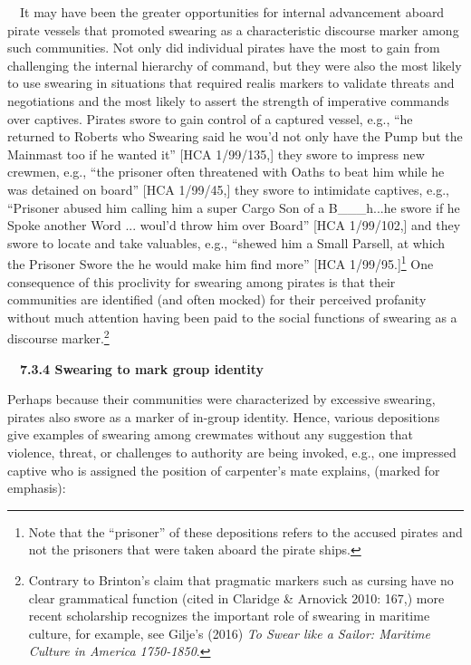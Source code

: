 \begin{styleStandard}
\ \ It may have been the greater opportunities for internal advancement aboard pirate vessels that promoted swearing as a characteristic discourse marker among such communities. Not only did individual pirates have the most to gain from challenging the internal hierarchy of command, but they were also the most likely to use swearing in situations that required realis markers to validate threats and negotiations and the most likely to assert the strength of imperative commands over captives. Pirates swore to gain control of a captured vessel, e.g., “he returned to Roberts who Swearing said he wou’d not only have the Pump but the Mainmast too if he wanted it” [HCA 1/99/135,] they swore to impress new crewmen, e.g., “the prisoner often threatened with Oaths to beat him while he was detained on board” [HCA 1/99/45,] they swore to intimidate captives, e.g., “Prisoner abused him calling him a super Cargo Son of a B\_\_\_h...he swore if he Spoke another Word ... woul’d throw him over Board” [HCA 1/99/102,] and they swore to locate and take valuables, e.g., “shewed him a Small Parsell, at which the Prisoner Swore the he would make him find more” [HCA 1/99/95.]\footnote{ Note that the “prisoner” of these depositions refers to the accused pirates and not the prisoners that were taken aboard the pirate ships. } One consequence of this proclivity for swearing among pirates is that their communities are identified (and often mocked) for their perceived profanity without much attention having been paid to the social functions of swearing as a discourse marker.\footnote{ Contrary to Brinton’s claim that pragmatic markers such as cursing have no clear grammatical function (cited in Claridge \& Arnovick 2010: 167,) more recent scholarship recognizes the important role of swearing in maritime culture, for example, see Gilje’s (2016) \textit{To Swear like a Sailor: Maritime Culture in America 1750-1850}.} 
\end{styleStandard}


\begin{styleStandard}
\ \ \textbf{7.3.4 Swearing to mark group identity}
\end{styleStandard}


\begin{styleStandard}
Perhaps because their communities were characterized by excessive swearing, pirates also swore as a marker of in-group identity. Hence, various depositions give examples of swearing among crewmates without any suggestion that violence, threat, or challenges to authority are being invoked, e.g., one impressed captive who is assigned the position of carpenter’s mate explains, (marked for emphasis): 
\end{styleStandard}


